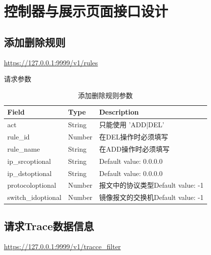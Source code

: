 \section{控制器与展示页面接口设计}

\subsection{添加删除规则}

\url{https://127.0.0.1:9999/v1/rules}

请求参数

\begin{table}[]
    \centering
    \caption{添加删除规则参数}
    \label{tbl:add_del_rule}
    \begin{tabular}{lll} \hline
    Field              & Type   & Description                 \\ \hline
    act                & String & 只能使用 'ADD|DEL'              \\
    rule\_id           & Number & 在DEL操作时必须填写                 \\
    rule\_name         & String & 在ADD操作时必须填写                 \\
    ip\_srcoptional    & String & Default value: 0.0.0.0      \\
    ip\_dstoptional    & String & Default value: 0.0.0.0      \\
    protocoloptional   & Number & 报文中的协议类型Default value: -1   \\
    switch\_idoptional & Number & 镜像报文的交换机Default value: -1 \\ \hline
    \end{tabular}
\end{table}

\subsection{请求Trace数据信息}

\url{https://127.0.0.1:9999/v1/tracce_filter}

